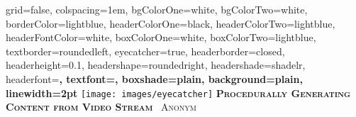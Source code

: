 \documentclass[landscape,final,a0paper,fontscale=0.285]{baposter}
\begin{document}
\begin{poster}%
  {
  grid=false,
  colspacing=1em,
  bgColorOne=white,
  bgColorTwo=white,
  borderColor=lightblue,
  headerColorOne=black,
  headerColorTwo=lightblue,
  headerFontColor=white,
  boxColorOne=white,
  boxColorTwo=lightblue,
  textborder=roundedleft,
  eyecatcher=true,
  headerborder=closed,
  headerheight=0.1\textheight,
  headershape=roundedright,
  headershade=shadelr,
  headerfont=\Large\bf\textsc, %
  textfont={\setlength{\parindent}{1.5em}},
  boxshade=plain,
  background=plain,
  linewidth=2pt
  }
  {\texttt{[image: images/eyecatcher]}} 
  {\bf\textsc{Procedurally Generating Content from Video Stream}\vspace{0.5em}}
  {\textsc{\ Anonym}}
  {%
  }

    \newcommand{\colouredcircle}{%
      \tikz{\useasboundingbox (-0.2em,-0.32em) rectangle(0.2em,0.32em); \draw[draw=black,fill=lightblue,line width=0.03em] (0,0) circle(0.18em);}}

\end{poster}
\end{document}
